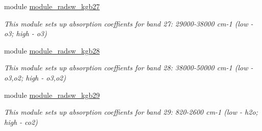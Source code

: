 \begin{DoxyCompactItemize}
module \hyperlink{namespacemodule__radsw__kgb27}{module\+\_\+radsw\+\_\+kgb27}
\begin{DoxyCompactList}\small\item\em This module sets up absorption coeffients for band 27\+: 29000-\/38000 cm-\/1 (low -\/ o3; high -\/ o3) \end{DoxyCompactList}\item 
module \hyperlink{namespacemodule__radsw__kgb28}{module\+\_\+radsw\+\_\+kgb28}
\begin{DoxyCompactList}\small\item\em This module sets up absorption coeffients for band 28\+: 38000-\/50000 cm-\/1 (low -\/ o3,o2; high -\/ o3,o2) \end{DoxyCompactList}\item 
module \hyperlink{namespacemodule__radsw__kgb29}{module\+\_\+radsw\+\_\+kgb29}
\begin{DoxyCompactList}\small\item\em This module sets up absorption coeffients for band 29\+: 820-\/2600 cm-\/1 (low -\/ h2o; high -\/ co2) \end{DoxyCompactList}\end{DoxyCompactItemize}
